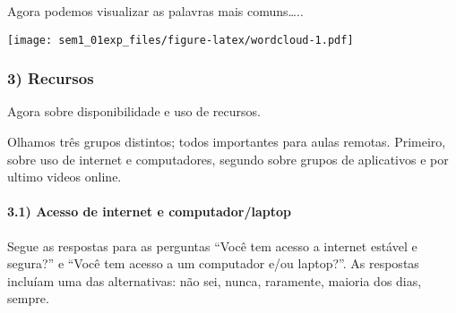 \documentclass[
]{article}
\newenvironment{Shaded}{\begin{snugshade}}{\end{snugshade}}
\newcommand{\CommentTok}[1]{\textcolor[rgb]{0.56,0.35,0.01}{\textit{#1}}}
\newcommand{\DataTypeTok}[1]{\textcolor[rgb]{0.13,0.29,0.53}{#1}}
\newcommand{\DecValTok}[1]{\textcolor[rgb]{0.00,0.00,0.81}{#1}}
\newcommand{\KeywordTok}[1]{\textcolor[rgb]{0.13,0.29,0.53}{\textbf{#1}}}
\newcommand{\NormalTok}[1]{#1}
\newcommand{\OperatorTok}[1]{\textcolor[rgb]{0.81,0.36,0.00}{\textbf{#1}}}
\newcommand{\StringTok}[1]{\textcolor[rgb]{0.31,0.60,0.02}{#1}}
\begin{document}
Agora podemos visualizar as palavras mais comuns\ldots..

\begin{Shaded}
\end{Shaded}

\texttt{[image: sem1\_01exp\_files/figure-latex/wordcloud-1.pdf]}

\newpage

\hypertarget{recursos}{%
\subsubsection{3) Recursos}\label{recursos}}

Agora sobre disponibilidade e uso de recursos.

Olhamos três grupos distintos; todos importantes para aulas remotas.
Primeiro, sobre uso de internet e computadores, segundo sobre grupos de
aplicativos e por ultimo videos online.

\hypertarget{acesso-de-internet-e-computadorlaptop}{%
\paragraph{3.1) Acesso de internet e
computador/laptop}\label{acesso-de-internet-e-computadorlaptop}}

Segue as respostas para as perguntas ``Você tem acesso a internet
estável e segura?'' e ``Você tem acesso a um computador e/ou laptop?''.
As respostas incluíam uma das alternativas: não sei, nunca, raramente,
maioria dos dias, sempre.
\end{document}

